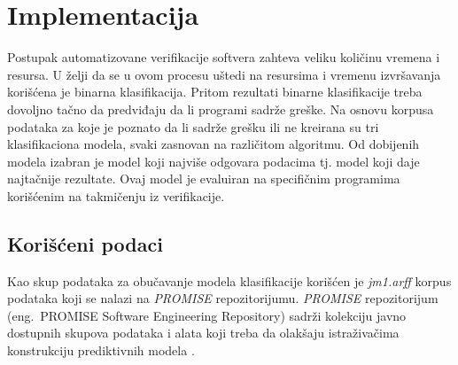 \documentclass[12pt,oneside]{memoir}
\begin{document}



\chapter{Implementacija}

Postupak automatizovane verifikacije softvera zahteva veliku količinu vremena i resursa. 
U želji da se u ovom procesu uštedi na resursima i vremenu izvršavanja korišćena je binarna klasifikacija. Pritom rezultati binarne klasifikacije treba dovoljno tačno da predviđaju da li programi sadrže greške. Na osnovu korpusa podataka za koje je poznato da li sadrže grešku ili ne kreirana su tri klasifikaciona modela, svaki zasnovan na različitom algoritmu. Od dobijenih modela izabran je model koji najviše odgovara podacima tj. model koji daje najtačnije rezultate. Ovaj model je evaluiran na specifičnim programima korišćenim na takmičenju iz verifikacije. 

\section{Korišćeni podaci}
\label{kor_podaci}

Kao skup podataka za obučavanje modela klasifikacije korišćen je \textit{jm1.arff} korpus podataka koji se nalazi na \textit{PROMISE} repozitorijumu. \textit{PROMISE} repozitorijum (eng.~PROMISE Software Engineering Repository) sadrži kolekciju javno dostupnih skupova podataka i alata koji treba da olakšaju istraživačima konstrukciju prediktivnih modela \cite{promise}. 
\end{document}
